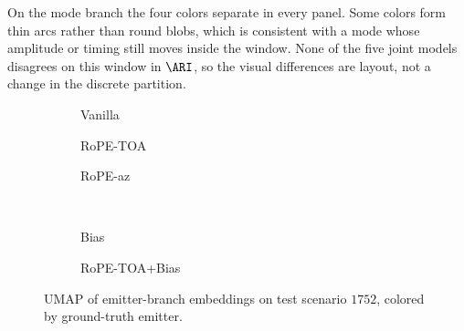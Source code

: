 On the mode branch the four colors separate in every panel.
Some colors form thin arcs rather than round blobs, which is consistent with a mode whose amplitude or timing still moves inside the window.
None of the five joint models disagrees on this window in $\ARI$, so the visual differences are layout, not a change in the discrete partition.

\begin{figure}[p]
  \centering
  \begin{subfigure}[t]{0.32\linewidth}
    \centering
    \caption{Vanilla}
    \label{fig:exp:emb_w100_em:vanilla}
  \end{subfigure}\hfill
  \begin{subfigure}[t]{0.32\linewidth}
    \centering
    \caption{RoPE-TOA}
    \label{fig:exp:emb_w100_em:rope_toa}
  \end{subfigure}\hfill
  \begin{subfigure}[t]{0.32\linewidth}
    \centering
    \caption{RoPE-az}
    \label{fig:exp:emb_w100_em:rope_az}
  \end{subfigure}\\[0.4em]
  \begin{subfigure}[t]{0.32\linewidth}
    \centering
    \caption{Bias}
    \label{fig:exp:emb_w100_em:bias}
  \end{subfigure}\hspace{0.02\linewidth}
  \begin{subfigure}[t]{0.32\linewidth}
    \centering
    \caption{RoPE-TOA+Bias}
    \label{fig:exp:emb_w100_em:combined}
  \end{subfigure}
  \caption{UMAP of emitter-branch embeddings on test scenario $1752$, colored by ground-truth emitter.}
  \label{fig:exp:emb_w100_em}
\end{figure}

